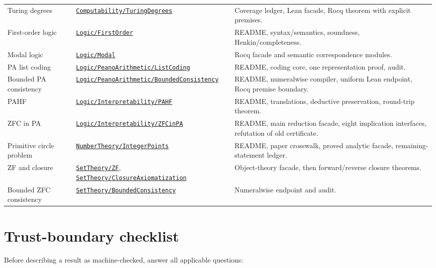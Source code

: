 \documentclass[
  10pt,
  a4paper,
  twoside,
  open=any,
  parskip=half,
  headings=big
]{scrreprt}
\newcommand{\CommitFull}{56a402bf82a9aab119fcbe3e96b991d387b221c5}
\newcommand{\RepoWeb}{https://github.com/VladimirReshetnikov/ProveIt}
\newcommand{\RepoTreeBase}{\RepoWeb/tree/\CommitFull}
\newcommand{\RepoDir}[1]{\href{\RepoTreeBase/#1}{\nolinkurl{#1}}}
\begin{document}
{\begin{longtable}{@{}L{35mm}L{52mm}L{64mm}@{}}
Turing degrees & \RepoDir{Computability/TuringDegrees} & Coverage ledger, Lean facade, Rocq theorem with explicit premises. \\
First-order logic & \RepoDir{Logic/FirstOrder} & README, syntax/semantics, soundness, Henkin/completeness. \\
Modal logic & \RepoDir{Logic/Modal} & Rocq facade and semantic correspondence modules. \\
PA list coding & \RepoDir{Logic/PeanoArithmetic/ListCoding} & README, coding core, one representation proof, audit. \\
Bounded PA consistency & \RepoDir{Logic/PeanoArithmetic/BoundedConsistency} & README, numeralwise compiler, uniform Lean endpoint, Rocq premise boundary. \\
PAHF & \RepoDir{Logic/Interpretability/PAHF} & README, translations, deductive preservation, round-trip theorem. \\
ZFC in PA & \RepoDir{Logic/Interpretability/ZFCinPA} & README, main reduction facade, eight implication interfaces, refutation of old certificate. \\
Primitive circle problem & \RepoDir{NumberTheory/IntegerPoints} & README, paper crosswalk, proved analytic facade, remaining-statement ledger. \\
ZF and closure & \RepoDir{SetTheory/ZF}, \RepoDir{SetTheory/ClosureAxiomatization} & Object-theory facade, then forward/reverse closure theorems. \\
Bounded ZFC consistency & \RepoDir{SetTheory/BoundedConsistency} & Numeralwise endpoint and audit. \\
\end{longtable}
}

\chapter{Trust-boundary checklist}
\label{app:trust-checklist}

Before describing a result as machine-checked, answer all applicable questions:
\end{document}
